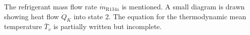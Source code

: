 The refrigerant mass flow rate \( \dot{m}_{\text{R134a}} \) is mentioned. A small diagram is drawn showing heat flow \( \dot{Q}_K \) into state 2.  
The equation for the thermodynamic mean temperature \( \bar{T}_v \) is partially written but incomplete.